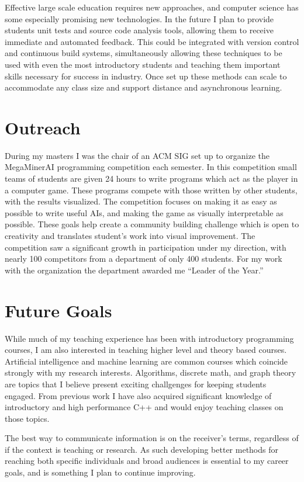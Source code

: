 \documentclass[a4paper, 11pt]{article}
\begin{document}
Effective large scale education requires new approaches,
and computer science has some especially promising new
technologies. In the future I plan to provide students
unit tests and source code analysis tools, allowing them
to receive immediate and automated feedback. This could
be integrated with version control and continuous build systems,
simultaneously allowing these techniques to be used with even
the most introductory students and teaching them important
skills necessary for success in industry. Once set up these
methods can scale to accommodate any class size and support
distance and asynchronous learning.

\section{Outreach}
During my masters I was the chair of an ACM SIG set up to organize
the MegaMinerAI programming competition each semester.
In this competition small teams of students are given
24 hours to write programs which act as the player in a computer game.
These programs compete with those written by other students,
with the results visualized. The competition focuses on making
it as easy as possible to write useful AIs, and making the game
as visually interpretable as possible. These goals help create
a community building challenge which is open to creativity and
translates student’s work into visual improvement.
The competition saw a significant growth in participation under
my direction, with nearly 100 competitors from a department of
only 400 students. For my work with the organization the department
awarded me “Leader of the Year.”

\section{Future Goals}
While much of my teaching experience has been with introductory
programming courses, I am also interested in teaching higher level
and theory based courses. Artificial intelligence and machine learning
are common courses which coincide strongly with my research interests.
Algorithms, discrete math, and graph theory are topics that I believe
present exciting challgenges for keeping students engaged.
From previous work I have also acquired significant knowledge of
introductory and high performance C++ and would enjoy teaching classes
on those topics.

The best way to communicate information is on the receiver's
terms, regardless of if the context is teaching or research.
As such developing better methods for reaching both specific
individuals and broad audiences is essential to my career goals,
and is something I plan to continue improving.
\end{document}
